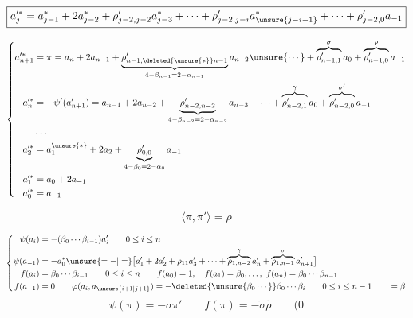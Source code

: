 \[
\boxed{a_j^{\prime *}=a_{j-1}^{*}+2a_{j-2}^*+\rho'_{j-2,j-2}a_{j-3}^*+\cdots+\rho'_{j-2,j-i}a_{\unsure{j-i-1}}^*+\cdots+\rho'_{j-2,0}a_{-1}}
\]

\[
\left\{\begin{aligned}
a_{n+1}^{\prime *}&=\pi=a_n+2a_{n-1}+\underbrace{\rho'_{n-1,\deleted{\unsure{*}}n-1}}_{4-\beta_{n-1}=2-\alpha_{n-1}}a_{n-2}\unsure{\cdots}+\overbrace{\rho'_{n-1,1}}^\sigma a_0+\overbrace{\rho'_{n-1,0}}^\rho a_{-1}\\
a_n^{\prime *}&=-\psi'(a'_{n+1})=a_{n-1}+2a_{n-2}+\underbrace{\rho'_{n-2,n-2}}_{4-\beta_{n-2}=2-\alpha_{n-2}}a_{n-3}+\cdots+\overbrace{\rho'_{n-2,1}}^\gamma a_0+\overbrace{\rho'_{n-2,0}}^{\sigma'}a_{-1}\\
&\cdots\\
a_2^{\prime *}&=a_1^{\unsure{*}}+2a_2+\underbrace{\rho'_{0,0}}_{4-\beta_0=2-\alpha_0}a_{-1}\\
a_1^{\prime *}&=a_0+2a_{-1}\\
a_0^{\prime *}&=a_{-1}
\end{aligned}\right.
\]

\[
\boxed{\langle\pi,\pi'\rangle=\rho}
\]

\[
\left\{\begin{aligned}
\psi(a_i)&=-(\beta_0\cdots\beta_{i-1})a'_i\qquad 0\le i\le n\\
\psi(a_{-1})&=-a_0^*\unsure{=-|=}\bigl[a'_1+2a'_2+\rho_{11}a'_3+\cdots+\overbrace{\rho_{1,n-2}}^\gamma a'_n+\overbrace{\rho_{1,n-1}}^\sigma a'_{n+1}\bigr]\\
f(a_i)&=\beta_0\cdots\beta_{i-1}\qquad 0\le i\le n\qquad f(a_0)=1,\quad f(a_1)=\beta_0,\ldots,\ f(a_n)=\beta_0\cdots\beta_{n-1}\\
f(a_{-1})&=0\qquad \varphi(a_i,a_{\unsure{i+1|j+1}})=-\deleted{\unsure{\beta_0\cdots}}\beta_0\cdots\beta_i\qquad 0\le i\le n-1\qquad =\beta
\end{aligned}\right.
\]
\[
\psi(\pi)=-\sigma\pi'\qquad f(\pi)=-\widetilde{\sigma}\widetilde{\rho}\qquad(0
\]


